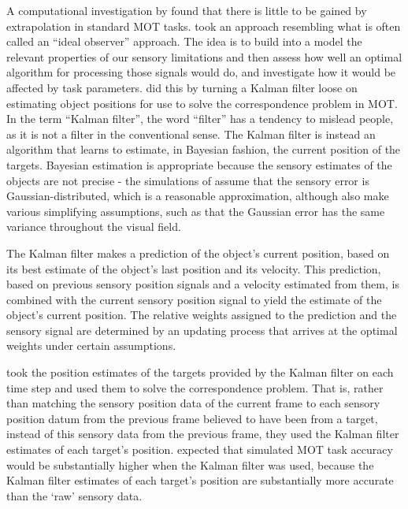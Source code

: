 \documentclass[
]{book}
\begin{document}
A computational investigation by \citet{zhongWhyPeopleAppear2014} found that there is little to be gained by extrapolation in standard MOT tasks. \citet{zhongWhyPeopleAppear2014} took an approach resembling what is often called an ``ideal observer'' approach. The idea is to build into a model the relevant properties of our sensory limitations and then assess how well an optimal algorithm for processing those signals would do, and investigate how it would be affected by task parameters. \citet{zhongWhyPeopleAppear2014} did this by turning a Kalman filter loose on estimating object positions for use to solve the correspondence problem in MOT. In the term ``Kalman filter'', the word ``filter'' has a tendency to mislead people, as it is not a filter in the conventional sense. The Kalman filter is instead an algorithm that learns to estimate, in Bayesian fashion, the current position of the targets. Bayesian estimation is appropriate because the sensory estimates of the objects are not precise - the simulations of \citet{zhongWhyPeopleAppear2014} assume that the sensory error is Gaussian-distributed, which is a reasonable approximation, although \citet{zhongWhyPeopleAppear2014} also make various simplifying assumptions, such as that the Gaussian error has the same variance throughout the visual field.

The Kalman filter makes a prediction of the object's current position, based on its best estimate of the object's last position and its velocity. This prediction, based on previous sensory position signals and a velocity estimated from them, is combined with the current sensory position signal to yield the estimate of the object's current position. The relative weights assigned to the prediction and the sensory signal are determined by an updating process that arrives at the optimal weights under certain assumptions.

\citet{zhongWhyPeopleAppear2014} took the position estimates of the targets provided by the Kalman filter on each time step and used them to solve the correspondence problem. That is, rather than matching the sensory position data of the current frame to each sensory position datum from the previous frame believed to have been from a target, instead of this sensory data from the previous frame, they used the Kalman filter estimates of each target's position. \citet{zhongWhyPeopleAppear2014} expected that simulated MOT task accuracy would be substantially higher when the Kalman filter was used, because the Kalman filter estimates of each target's position are substantially more accurate than the `raw' sensory data.
\end{document}
